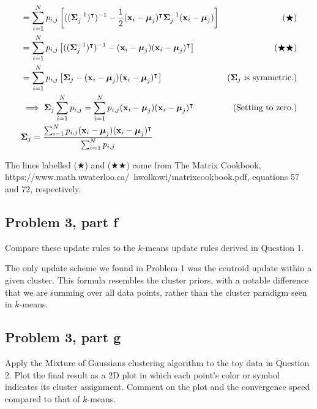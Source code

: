 \begin{solution}
\begin{align*}
        &= \sum_{i = 1}^N p_{i, j} \left[ ((\boldsymbol{\Sigma}^{-1}_j)^{\intercal})^{-1} - \frac{1}{2}(\textbf{x}_i - \boldsymbol{\mu}_j)^{\intercal} \boldsymbol{\Sigma}^{-1}_j (\textbf{x}_i - \boldsymbol{\mu}_j)\right] &(\bigstar)\\
        &= \sum_{i = 1}^N p_{i, j} \left[ ((\boldsymbol{\Sigma}^{-1}_j)^{\intercal})^{-1} - (\textbf{x}_i - \boldsymbol{\mu}_j) (\textbf{x}_i - \boldsymbol{\mu}_j)^{\intercal} \right] &(\bigstar \bigstar)\\
        &= \sum_{i = 1}^N p_{i, j} \left[ \boldsymbol{\Sigma}_j - (\textbf{x}_i - \boldsymbol{\mu}_j) (\textbf{x}_i - \boldsymbol{\mu}_j)^{\intercal} \right] &\text{($\boldsymbol{\Sigma}_j$ is symmetric.)}\\
        &\implies \boldsymbol{\Sigma}_j \sum_{i = 1}^N p_{i, j} = \sum_{i = 1}^N p_{i, j}(\textbf{x}_i - \boldsymbol{\mu}_j)(\textbf{x}_i - \boldsymbol{\mu}_j)^{\intercal}  &\text{(Setting to zero.)}\\
        &\boldsymbol{\Sigma}_j = \frac{\sum_{i = 1}^N p_{i, j}(\textbf{x}_i - \boldsymbol{\mu}_j)(\textbf{x}_i - \boldsymbol{\mu}_j)^{\intercal}}{\sum_{i = 1}^N p_{i, j}}
    \end{align*}
    \vspace{-12mm} \alignbreak

    The lines labelled ($\bigstar$) and ($\bigstar \bigstar$) come from The Matrix Cookbook, https://www.math.uwaterloo.ca/~hwolkowi/matrixcookbook.pdf, equations 57 and 72, respectively.  
\end{solution}

\newpage
\subsection{Problem 3, part f}
Compare these update rules to the $k$-means update rules derived in Question 1. 
\partbreak
\begin{solution}

    The only update scheme we found in Problem 1 was the centroid update within a given cluster. This formula resembles the cluster priors, with a notable difference that we are summing over all data points, rather than the cluster paradigm seen in $k$-means.   
\end{solution}

\newpage
\subsection{Problem 3, part g}
Apply the Mixture of Gaussians clustering algorithm to the toy data in Question 2. Plot the final result as a 2D plot in which each point's color or symbol indicates its cluster assignment. Comment on the plot and the convergence speed compared to that of $k$-means. 
\partbreak

